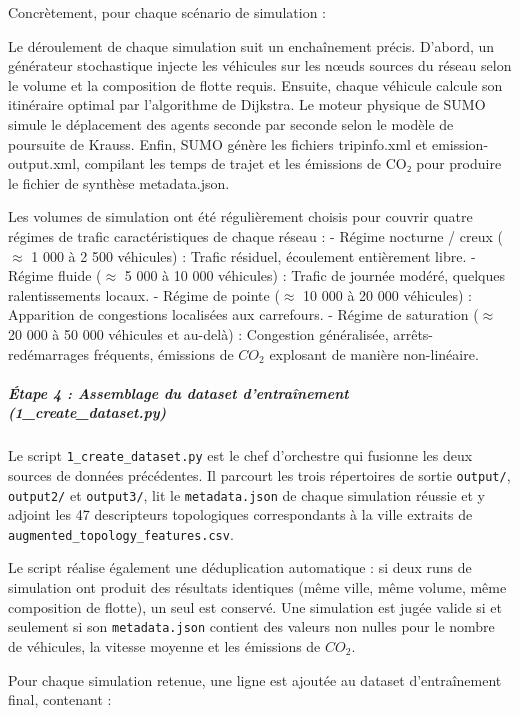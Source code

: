 \documentclass[10pt, a4paper]{article}
\begin{document}
Concrètement, pour chaque scénario de simulation :

Le déroulement de chaque simulation suit un enchaînement précis.
D'abord, un générateur stochastique injecte les véhicules sur les nœuds
sources du réseau selon le volume et la composition de flotte requis.
Ensuite, chaque véhicule calcule son itinéraire optimal par l'algorithme
de Dijkstra. Le moteur physique de SUMO simule le déplacement des agents
seconde par seconde selon le modèle de poursuite de Krauss. Enfin, SUMO
génère les fichiers tripinfo.xml et emission-output.xml, compilant les
temps de trajet et les émissions de CO₂ pour produire le fichier de
synthèse metadata.json.

Les volumes de simulation ont été régulièrement choisis pour couvrir
quatre régimes de trafic caractéristiques de chaque réseau : - Régime
nocturne / creux (\(\approx\) 1 000 à 2 500 véhicules) : Trafic
résiduel, écoulement entièrement libre. - Régime fluide (\(\approx\) 5
000 à 10 000 véhicules) : Trafic de journée modéré, quelques
ralentissements locaux. - Régime de pointe (\(\approx\) 10 000 à 20 000
véhicules) : Apparition de congestions localisées aux carrefours. -
Régime de saturation (\(\approx\) 20 000 à 50 000 véhicules et au-delà)
: Congestion généralisée, arrêts-redémarrages fréquents, émissions de
\(CO_2\) explosant de manière non-linéaire.

\subparagraph{Étape 4 : Assemblage du dataset d'entraînement
(1\_create\_dataset.py)}\label{uxe9tape-4-assemblage-du-dataset-dentrauxeenement-1_create_dataset.py}

Le script \texttt{1\_create\_dataset.py} est le chef d'orchestre qui
fusionne les deux sources de données précédentes. Il parcourt les trois
répertoires de sortie \texttt{output/}, \texttt{output2/} et
\texttt{output3/}, lit le \texttt{metadata.json} de chaque simulation
réussie et y adjoint les 47 descripteurs topologiques correspondants à
la ville extraits de \texttt{augmented\_topology\_features.csv}.

Le script réalise également une déduplication automatique : si deux runs
de simulation ont produit des résultats identiques (même ville, même
volume, même composition de flotte), un seul est conservé. Une
simulation est jugée valide si et seulement si son
\texttt{metadata.json} contient des valeurs non nulles pour le nombre de
véhicules, la vitesse moyenne et les émissions de \(CO_2\).

Pour chaque simulation retenue, une ligne est ajoutée au dataset
d'entraînement final, contenant :
\end{document}
